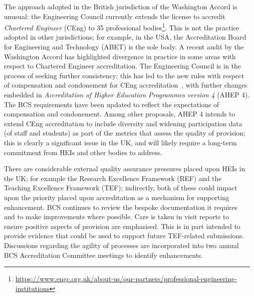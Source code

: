 \documentclass[sigconf]{acmart}
\begin{document}
The approach
adopted in the British jurisdiction of the Washington Accord is
unusual: the Engineering Council currently extends the license
to accredit {\emph{Chartered Engineer}} (CEng) to 35 
professional bodies\footnote{\url{https://www.engc.org.uk/about-us/our-partners/professional-engineering-institutions}}. This is not the practice adopted in
other jurisdictions; for example, in the USA, the Accreditation Board
for Engineering and Technology (ABET) is the sole body. A recent audit
by the Washington Accord has highlighted divergence in practice in
some areas with respect to Chartered Engineer accreditation. The
Engineering Council is in the process of seeking further consistency;
this has led to the new rules with respect of compensation and
condonement for CEng accreditation~\cite{EC2018}, with further changes
embedded in {\emph{Accreditation of Higher Education Programmes
version 4}} (AHEP 4). The BCS requirements have been updated to
reflect the expectations of compensation and condonement. Among other
proposals, AHEP 4 intends to extend CEng accreditation to include
diversity and widening participation data (of staff and students) as
part of the metrics that assess the quality of provision; this is
clearly a significant issue in the UK, and will likely require a
long-term commitment from HEIs and other bodies to address.

There are considerable external quality assurance
pressures placed upon HEIs in the UK; for example the Research
Excellence Framework (REF) and the Teaching Excellence Framework
(TEF); indirectly, both of these could impact upon the priority placed
upon accreditation as a mechanism for supporting enhancement. BCS
continues to review the bespoke documentation it requires and to make
improvements where possible. Care is taken in visit reports to ensure
positive aspects of provision are emphasised. This is in part intended
to provide evidence that could be used to support future TEF-related
submissions. Discussions regarding the agility of processes are
incorporated into two annual BCS Accreditation Committee meetings to
identify enhancements.
\end{document}
